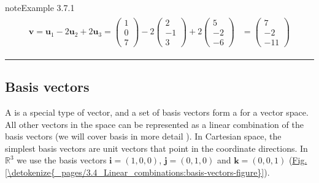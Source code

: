 \documentclass[letterpaper,10pt,english]{jupyterBook}
\begin{document}
\begin{sphinxadmonition}{note}{Example 3.7.1}
\begin{equation*}
\begin{split}
\begin{align*}
    \mathbf{v} = \mathbf{u}_1 - 2\mathbf{u}_2 + 2\mathbf{u}_3
    =  \begin{pmatrix} 1 \\ 0 \\ 7 \end{pmatrix} 
    - 2 \begin{pmatrix} 2 \\ -1 \\ 3 \end{pmatrix} 
    + 2 \begin{pmatrix} 5 \\ -2 \\ -6 \end{pmatrix}
    &= \begin{pmatrix} 7 \\ -2 \\ -11 \end{pmatrix}
\end{align*} \end{split}
\end{equation*}\end{sphinxadmonition}




\bigskip\hrule\bigskip


\ignorespaces 

\subsection{Basis vectors}
\label{\detokenize{_pages/3.4_Linear_combinations:basis-vectors}}\label{\detokenize{_pages/3.4_Linear_combinations:index-1}}\label{\detokenize{_pages/3.4_Linear_combinations:basis-vectors-section}}
\sphinxAtStartPar
A  is a special type of vector, and a set of basis vectors form a  for a vector space. All other vectors in the space can be represented as a linear combination of the basis vectors (we will cover basis in more detail {\hyperref[\detokenize{_pages/5.4_Basis:basis-section}]{}}). In Cartesian space, the simplest basis vectors are unit vectors that point in the coordinate directions. In \(\mathbb{R}^3\) we use the basis vectors \(\mathbf{i} = (1, 0, 0)\), \(\mathbf{j} = (0, 1, 0)\) and \(\mathbf{k} = (0, 0, 1)\) (\hyperref[\detokenize{_pages/3.4_Linear_combinations:basis-vectors-figure}]{Fig.\@ \ref{\detokenize{_pages/3.4_Linear_combinations:basis-vectors-figure}}}).
\end{document}
